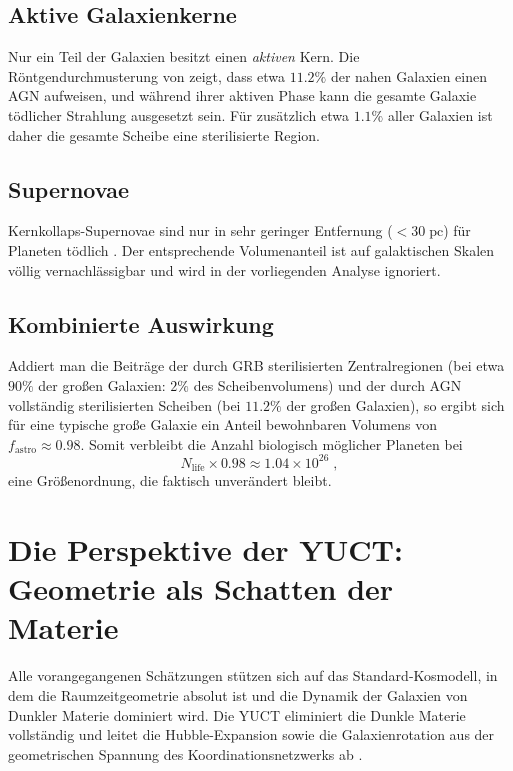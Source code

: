 \documentclass[11pt,a4paper]{article}
\begin{document}
	\subsection{Aktive Galaxienkerne}
	\label{sec:agn}
	Nur ein Teil der Galaxien besitzt einen \emph{aktiven} Kern. Die Röntgendurchmusterung von \citet{Foord2017} zeigt, dass etwa \(11.2\%\) der nahen Galaxien einen AGN aufweisen, und während ihrer aktiven Phase kann die gesamte Galaxie tödlicher Strahlung ausgesetzt sein. Für zusätzlich etwa \(1.1\%\) aller Galaxien ist daher die gesamte Scheibe eine sterilisierte Region.
	
	\subsection{Supernovae}
	\label{sec:sne}
	Kernkollaps-Supernovae sind nur in sehr geringer Entfernung (\(< 30\;\mathrm{pc}\)) für Planeten tödlich \citep{ThomasYelland2023}. Der entsprechende Volumenanteil ist auf galaktischen Skalen völlig vernachlässigbar und wird in der vorliegenden Analyse ignoriert.
	
	\subsection{Kombinierte Auswirkung}
	\label{sec:total_astro}
	Addiert man die Beiträge der durch GRB sterilisierten Zentralregionen (bei etwa \(90\%\) der großen Galaxien: \(2\%\) des Scheibenvolumens) und der durch AGN vollständig sterilisierten Scheiben (bei \(11.2\%\) der großen Galaxien), so ergibt sich für eine typische große Galaxie ein Anteil bewohnbaren Volumens von \(f_{\mathrm{astro}} \approx 0.98\). Somit verbleibt die Anzahl biologisch möglicher Planeten bei
	\begin{equation}
		N_{\mathrm{life}} \times 0.98 \approx 1.04\times 10^{26}\; ,
	\end{equation}
	eine Größenordnung, die faktisch unverändert bleibt.
	
	\section{Die Perspektive der YUCT: Geometrie als Schatten der Materie}
	\label{sec:yuct_geometry}
	Alle vorangegangenen Schätzungen stützen sich auf das Standard-Kosmodell, in dem die Raumzeitgeometrie absolut ist und die Dynamik der Galaxien von Dunkler Materie dominiert wird. Die YUCT eliminiert die Dunkle Materie vollständig und leitet die Hubble-Expansion sowie die Galaxienrotation aus der geometrischen Spannung des Koordinationsnetzwerks ab \citep{YUCT,AppGravity}.
	
\end{document}
